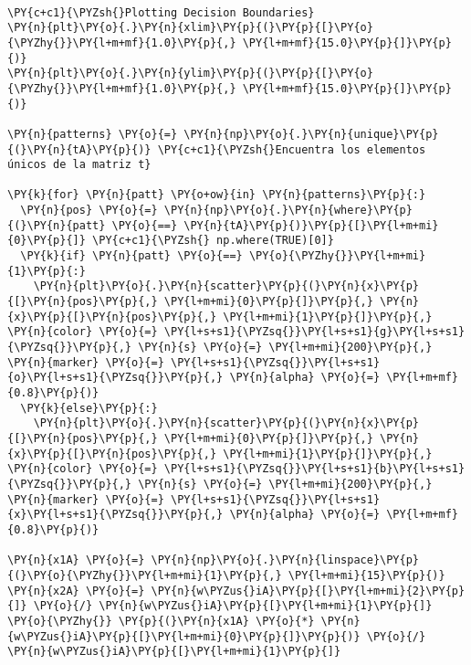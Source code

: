     \begin{center}
    \end{center}
    { \hspace*{\fill} \\}
    
    \begin{tcolorbox}[breakable, size=fbox, boxrule=1pt, pad at break*=1mm,colback=cellbackground, colframe=cellborder]
\begin{Verbatim}[commandchars=\\\{\}]
\PY{c+c1}{\PYZsh{}Plotting Decision Boundaries}
\PY{n}{plt}\PY{o}{.}\PY{n}{xlim}\PY{p}{(}\PY{p}{[}\PY{o}{\PYZhy{}}\PY{l+m+mf}{1.0}\PY{p}{,} \PY{l+m+mf}{15.0}\PY{p}{]}\PY{p}{)}
\PY{n}{plt}\PY{o}{.}\PY{n}{ylim}\PY{p}{(}\PY{p}{[}\PY{o}{\PYZhy{}}\PY{l+m+mf}{1.0}\PY{p}{,} \PY{l+m+mf}{15.0}\PY{p}{]}\PY{p}{)}

\PY{n}{patterns} \PY{o}{=} \PY{n}{np}\PY{o}{.}\PY{n}{unique}\PY{p}{(}\PY{n}{tA}\PY{p}{)} \PY{c+c1}{\PYZsh{}Encuentra los elementos únicos de la matriz t}

\PY{k}{for} \PY{n}{patt} \PY{o+ow}{in} \PY{n}{patterns}\PY{p}{:}
  \PY{n}{pos} \PY{o}{=} \PY{n}{np}\PY{o}{.}\PY{n}{where}\PY{p}{(}\PY{n}{patt} \PY{o}{==} \PY{n}{tA}\PY{p}{)}\PY{p}{[}\PY{l+m+mi}{0}\PY{p}{]} \PY{c+c1}{\PYZsh{} np.where(TRUE)[0]}
  \PY{k}{if} \PY{n}{patt} \PY{o}{==} \PY{o}{\PYZhy{}}\PY{l+m+mi}{1}\PY{p}{:}
    \PY{n}{plt}\PY{o}{.}\PY{n}{scatter}\PY{p}{(}\PY{n}{x}\PY{p}{[}\PY{n}{pos}\PY{p}{,} \PY{l+m+mi}{0}\PY{p}{]}\PY{p}{,} \PY{n}{x}\PY{p}{[}\PY{n}{pos}\PY{p}{,} \PY{l+m+mi}{1}\PY{p}{]}\PY{p}{,} \PY{n}{color} \PY{o}{=} \PY{l+s+s1}{\PYZsq{}}\PY{l+s+s1}{g}\PY{l+s+s1}{\PYZsq{}}\PY{p}{,} \PY{n}{s} \PY{o}{=} \PY{l+m+mi}{200}\PY{p}{,} \PY{n}{marker} \PY{o}{=} \PY{l+s+s1}{\PYZsq{}}\PY{l+s+s1}{o}\PY{l+s+s1}{\PYZsq{}}\PY{p}{,} \PY{n}{alpha} \PY{o}{=} \PY{l+m+mf}{0.8}\PY{p}{)}
  \PY{k}{else}\PY{p}{:}
    \PY{n}{plt}\PY{o}{.}\PY{n}{scatter}\PY{p}{(}\PY{n}{x}\PY{p}{[}\PY{n}{pos}\PY{p}{,} \PY{l+m+mi}{0}\PY{p}{]}\PY{p}{,} \PY{n}{x}\PY{p}{[}\PY{n}{pos}\PY{p}{,} \PY{l+m+mi}{1}\PY{p}{]}\PY{p}{,} \PY{n}{color} \PY{o}{=} \PY{l+s+s1}{\PYZsq{}}\PY{l+s+s1}{b}\PY{l+s+s1}{\PYZsq{}}\PY{p}{,} \PY{n}{s} \PY{o}{=} \PY{l+m+mi}{200}\PY{p}{,} \PY{n}{marker} \PY{o}{=} \PY{l+s+s1}{\PYZsq{}}\PY{l+s+s1}{x}\PY{l+s+s1}{\PYZsq{}}\PY{p}{,} \PY{n}{alpha} \PY{o}{=} \PY{l+m+mf}{0.8}\PY{p}{)}

\PY{n}{x1A} \PY{o}{=} \PY{n}{np}\PY{o}{.}\PY{n}{linspace}\PY{p}{(}\PY{o}{\PYZhy{}}\PY{l+m+mi}{1}\PY{p}{,} \PY{l+m+mi}{15}\PY{p}{)}
\PY{n}{x2A} \PY{o}{=} \PY{n}{w\PYZus{}iA}\PY{p}{[}\PY{l+m+mi}{2}\PY{p}{]} \PY{o}{/} \PY{n}{w\PYZus{}iA}\PY{p}{[}\PY{l+m+mi}{1}\PY{p}{]} \PY{o}{\PYZhy{}} \PY{p}{(}\PY{n}{x1A} \PY{o}{*} \PY{n}{w\PYZus{}iA}\PY{p}{[}\PY{l+m+mi}{0}\PY{p}{]}\PY{p}{)} \PY{o}{/} \PY{n}{w\PYZus{}iA}\PY{p}{[}\PY{l+m+mi}{1}\PY{p}{]}



\end{Verbatim}
\end{tcolorbox}
